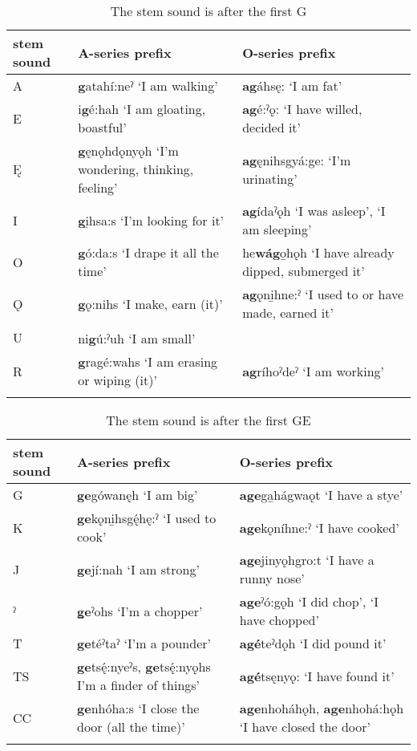 \begin{table}
\caption{The stem sound is after the first G}
\label{tab:1:firstg}
\scriptsize{
\begin{tabularx}{\textwidth}{XXX}
\lsptoprule
stem sound & A-series prefix & O-series prefix\\
\midrule
 A & \textbf{g}atahí:neˀ ‘I am walking’ & \textbf{ag}áhsę: ‘I am fat’\\
 E & i\textbf{g}é:hah ‘I am gloating, boastful’ & \textbf{ag}é:ˀǫ:  ‘I have willed, decided it’\\
 Ę & \textbf{g}ęnǫhdǫnyǫh ‘I’m wondering, thinking, feeling’ & \textbf{ag}ęnihsgyá:ge: ‘I’m urinating’\\
 I & \textbf{g}i̱hsa:s ‘I’m looking for it’ & \textbf{ag}ídaˀǫh ‘I was asleep’, ‘I am sleeping’\\
 O & \textbf{g}ó:da:s ‘I drape it all the time’ & he\textbf{wág}o̱hǫh ‘I have already dipped, submerged it’\\
 Ǫ & \textbf{g}ǫ:nihs ‘I make, earn (it)’ & \textbf{ag}ǫni̱hne:ˀ ‘I used to or have made, earned it’\\
 U & ni\textbf{g}ú:ˀuh ‘I am small’\textsuperscript{⁠} & \\
 R & \textbf{g}ragé:wahs ‘I am erasing or wiping (it)’ & \textbf{ag}ríhoˀdeˀ ‘I am working’\\
\lspbottomrule
\end{tabularx}}
\end{table}



\begin{table}
\caption{The stem sound is after the first GE}
\label{tab:1:fstge}
\scriptsize{
\begin{tabularx}{\textwidth}{XXX}
\lsptoprule
stem sound & A-series prefix & O-series prefix\\
\midrule
 G & \textbf{ge}gówanęh ‘I am big’ & \textbf{age}ga̱hágwaǫt ‘I have a stye’\\
 K & \textbf{ge}kǫni̱hsg\'{ę}hę:ˀ ‘I used to cook’ & \textbf{age}kǫníhne:ˀ ‘I have cooked’\\
 J & \textbf{ge}jí:nah ‘I am strong’ & \textbf{age}jinyǫhgro:t ‘I have a runny nose’\\
 ˀ & \textbf{g̱e}ˀohs ‘I’m a chopper’ & \textbf{age}ˀó:gǫh ‘I did chop’, ‘I have chopped’\\
 T & \textbf{ge}téˀtaˀ ‘I’m a pounder’ & \textbf{agé}teˀdǫh ‘I did pound it’\\
 TS & \textbf{ge}ts\'{ę}:nyeˀs, \textbf{ge}ts\'{ę}:nyǫhs I’m a finder of things’ & \textbf{agé}tsęnyǫ: ‘I have found it’\\
 CC & \textbf{ge}nhóha:s ‘I close the door (all the time)’ & \textbf{age}nhoháhǫh, \textbf{age}nhohá:hǫh ‘I have closed the door’\\
\lspbottomrule
\end{tabularx}}
\end{table}



